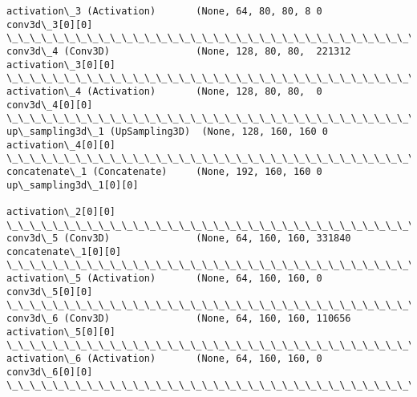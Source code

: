 \documentclass[11pt]{article}
\begin{document}
\begin{Verbatim}[commandchars=\\\{\}]
activation\_3 (Activation)       (None, 64, 80, 80, 8 0           conv3d\_3[0][0]                   
\_\_\_\_\_\_\_\_\_\_\_\_\_\_\_\_\_\_\_\_\_\_\_\_\_\_\_\_\_\_\_\_\_\_\_\_\_\_\_\_\_\_\_\_\_\_\_\_\_\_\_\_\_\_\_\_\_\_\_\_\_\_\_\_\_\_\_\_\_\_\_\_\_\_\_\_\_\_\_\_\_\_\_\_\_\_\_\_\_\_\_\_\_\_\_\_\_\_
conv3d\_4 (Conv3D)               (None, 128, 80, 80,  221312      activation\_3[0][0]               
\_\_\_\_\_\_\_\_\_\_\_\_\_\_\_\_\_\_\_\_\_\_\_\_\_\_\_\_\_\_\_\_\_\_\_\_\_\_\_\_\_\_\_\_\_\_\_\_\_\_\_\_\_\_\_\_\_\_\_\_\_\_\_\_\_\_\_\_\_\_\_\_\_\_\_\_\_\_\_\_\_\_\_\_\_\_\_\_\_\_\_\_\_\_\_\_\_\_
activation\_4 (Activation)       (None, 128, 80, 80,  0           conv3d\_4[0][0]                   
\_\_\_\_\_\_\_\_\_\_\_\_\_\_\_\_\_\_\_\_\_\_\_\_\_\_\_\_\_\_\_\_\_\_\_\_\_\_\_\_\_\_\_\_\_\_\_\_\_\_\_\_\_\_\_\_\_\_\_\_\_\_\_\_\_\_\_\_\_\_\_\_\_\_\_\_\_\_\_\_\_\_\_\_\_\_\_\_\_\_\_\_\_\_\_\_\_\_
up\_sampling3d\_1 (UpSampling3D)  (None, 128, 160, 160 0           activation\_4[0][0]               
\_\_\_\_\_\_\_\_\_\_\_\_\_\_\_\_\_\_\_\_\_\_\_\_\_\_\_\_\_\_\_\_\_\_\_\_\_\_\_\_\_\_\_\_\_\_\_\_\_\_\_\_\_\_\_\_\_\_\_\_\_\_\_\_\_\_\_\_\_\_\_\_\_\_\_\_\_\_\_\_\_\_\_\_\_\_\_\_\_\_\_\_\_\_\_\_\_\_
concatenate\_1 (Concatenate)     (None, 192, 160, 160 0           up\_sampling3d\_1[0][0]            
                                                                 activation\_2[0][0]               
\_\_\_\_\_\_\_\_\_\_\_\_\_\_\_\_\_\_\_\_\_\_\_\_\_\_\_\_\_\_\_\_\_\_\_\_\_\_\_\_\_\_\_\_\_\_\_\_\_\_\_\_\_\_\_\_\_\_\_\_\_\_\_\_\_\_\_\_\_\_\_\_\_\_\_\_\_\_\_\_\_\_\_\_\_\_\_\_\_\_\_\_\_\_\_\_\_\_
conv3d\_5 (Conv3D)               (None, 64, 160, 160, 331840      concatenate\_1[0][0]              
\_\_\_\_\_\_\_\_\_\_\_\_\_\_\_\_\_\_\_\_\_\_\_\_\_\_\_\_\_\_\_\_\_\_\_\_\_\_\_\_\_\_\_\_\_\_\_\_\_\_\_\_\_\_\_\_\_\_\_\_\_\_\_\_\_\_\_\_\_\_\_\_\_\_\_\_\_\_\_\_\_\_\_\_\_\_\_\_\_\_\_\_\_\_\_\_\_\_
activation\_5 (Activation)       (None, 64, 160, 160, 0           conv3d\_5[0][0]                   
\_\_\_\_\_\_\_\_\_\_\_\_\_\_\_\_\_\_\_\_\_\_\_\_\_\_\_\_\_\_\_\_\_\_\_\_\_\_\_\_\_\_\_\_\_\_\_\_\_\_\_\_\_\_\_\_\_\_\_\_\_\_\_\_\_\_\_\_\_\_\_\_\_\_\_\_\_\_\_\_\_\_\_\_\_\_\_\_\_\_\_\_\_\_\_\_\_\_
conv3d\_6 (Conv3D)               (None, 64, 160, 160, 110656      activation\_5[0][0]               
\_\_\_\_\_\_\_\_\_\_\_\_\_\_\_\_\_\_\_\_\_\_\_\_\_\_\_\_\_\_\_\_\_\_\_\_\_\_\_\_\_\_\_\_\_\_\_\_\_\_\_\_\_\_\_\_\_\_\_\_\_\_\_\_\_\_\_\_\_\_\_\_\_\_\_\_\_\_\_\_\_\_\_\_\_\_\_\_\_\_\_\_\_\_\_\_\_\_
activation\_6 (Activation)       (None, 64, 160, 160, 0           conv3d\_6[0][0]                   
\_\_\_\_\_\_\_\_\_\_\_\_\_\_\_\_\_\_\_\_\_\_\_\_\_\_\_\_\_\_\_\_\_\_\_\_\_\_\_\_\_\_\_\_\_\_\_\_\_\_\_\_\_\_\_\_\_\_\_\_\_\_\_\_\_\_\_\_\_\_\_\_\_\_\_\_\_\_\_\_\_\_\_\_\_\_\_\_\_\_\_\_\_\_\_\_\_\_

\end{Verbatim}
\end{document}
